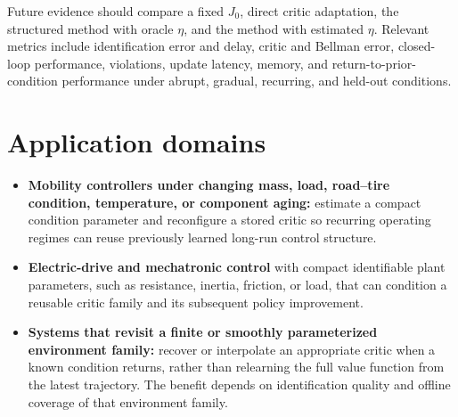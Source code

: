 \documentclass[a4paper]{article}
\begin{document}
Future evidence should compare a fixed $J_0$, direct critic adaptation, the
structured method with oracle $\eta$, and the method with estimated $\eta$.
Relevant metrics include identification error and delay, critic and Bellman
error, closed-loop performance, violations, update latency, memory, and
return-to-prior-condition performance under abrupt, gradual, recurring, and
held-out conditions.

\section{Application domains}

\begin{itemize}
  \item \textbf{Mobility controllers under changing mass, load, road--tire
  condition, temperature, or component aging:} estimate a compact condition
  parameter and reconfigure a stored critic so recurring operating regimes can
  reuse previously learned long-run control structure.
  \item \textbf{Electric-drive and mechatronic control} with compact
  identifiable plant parameters, such as resistance, inertia, friction, or
  load, that can condition a reusable critic family and its subsequent policy
  improvement.
  \item \textbf{Systems that revisit a finite or smoothly parameterized
  environment family:} recover or interpolate an appropriate critic when a
  known condition returns, rather than relearning the full value function from
  the latest trajectory. The benefit depends on identification quality and
  offline coverage of that environment family.
\end{itemize}
\end{document}
